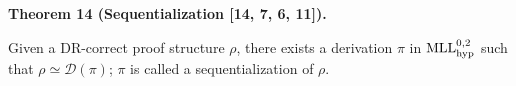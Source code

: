 \documentclass[10pt,a4paper]{amsart}
\begin{document}
   

 
\par\medskip\noindent\textbf{Theorem 14 (Sequentialization [14, 7, 6, 11]).}\par
 
 
Given a DR-correct proof structure $\rho$, there exists a derivation $\pi$ in $\textnormal{{MLL}}^{0,2}_{\textnormal{{hyp}}}$ such that $\rho\simeq\mathcal{D}(\pi)$; $\pi$ is called a sequentialization of $\rho$.\par
 
 
\end{document}
